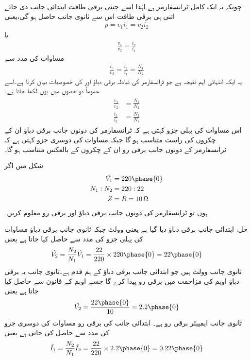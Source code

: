 چونکہ یہ ایک کامل ٹرانسفارمر ہے لہٰذا اسے جتنی برقی طاقت ابتدائی جانب  دی جائے اتنی ہی برقی طاقت اس سے ثانوی جانب حاصل ہو گی،یعنی
\begin{align}
p=v_1 i_1 = v_2 i_2
\end{align}
یا
\begin{align}
\frac{v_1}{v_2}=\frac{i_2}{i_1}
\end{align}
مساوات   کی مدد سے
\begin{align}
\frac{v_1}{v_2}=\frac{i_2}{i_1}=\frac{N_1}{N_2}
\end{align}
یہ ایک انتہائی اہم نتیجہ ہے جو ٹرانسفارمر کی تبادلہ برقی دباؤ اور   کی خصوصیات بیان کرتا ہے۔اسے عموماً دو حصوں میں یوں لکھا جاتا ہے۔
\begin{gather}
\begin{aligned}\label{مساوات_ٹرانسفارمر_تبادلہ_دباؤ_رو}
\frac{v_1}{v_2}&=\frac{N_1}{N_2}\\
\frac{i_1}{i_2}&=\frac{N_2}{N_1}
\end{aligned}
\end{gather}
اس مساوات کی پہلی جزو کہتی ہے کہ ٹرانسفارمر کی دونوں جانب برقی دباؤ  ان کے چکروں کی راست متناسب  ہو گا جبکہ مساوات کی دوسری جزو کہتی ہے کہ ٹرانسفارمر کے دونوں جانب برقی رو ان کے چکروں کے بالعکس متناسب ہو گا۔

	شکل    میں اگر
\begin{align*}
\hat{V_1}&=220 \phase{0}\\
N_1:N_2&=220:22\\
Z&=R=\SI{10}{\ohm}
\end{align*}
ہوں تو ٹرانسفارمر کی دونوں جانب برقی دباؤ اور برقی رو معلوم کریں۔

حل:
ابتدائی جانب برقی دباؤ دیا گیا ہے یعنی  وولٹ جبکہ ثانوی جانب برقی دباؤ مساوات  کی پہلی جزو کی مدد سے حاصل کیا جاتا ہے یعنی
\begin{align*}
\hat{V_2}=\frac{N_2}{N_1} \hat{V_1}=\frac{22}{220} \times 220\phase {0}=22\phase{0}
\end{align*}
ثانوی جانب  وولٹ ہیں جو ابتدائی جانب برقی دباؤ کے ہم قدم ہے۔ثانوی جانب یہ برقی دباؤ  اوہم کی مزاحمت میں برقی رو پیدا کرے گا جسے اوہم کے قانون سے حاصل کیا جاتا ہے یعنی
\begin{align*}
\hat{V_2}=\frac{22 \phase {0}}{10}=2.2\phase {0}
\end{align*}
ثانوی جانب  ایمپیئر برقی رو ہے۔ ابتدائی جانب کی برقی رو مساوات  کی دوسری جزو کی مدد سے حاصل کی جاتی ہے یعنی
\begin{align*}
\hat{I_1}=\frac{N_2}{N_1} \hat{I_2}=\frac{22}{220} \times 2.2\phase{0}=0.22\phase{0}
\end{align*}

